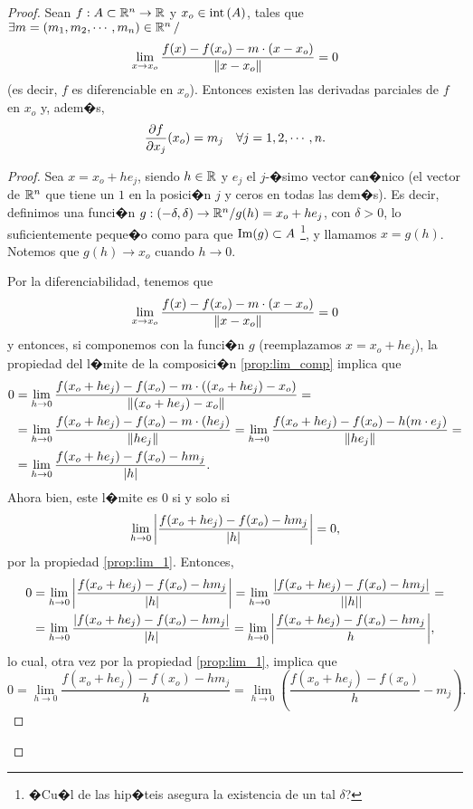 \documentclass[a4paper]{scrartcl} %
\begin{document}
\begin{theorem}
\begin{proof}
\iffalse
Entonces, por la propiedad \eqref{prop:lim_2}, tenemos que
\[
 \lim_{h \to 0} \frac{ f(x_o + h,y_o) - f(x_o,y_o) }{h} = \alpha,
\]
\fi
Sean $f: A \subset \mathbb{R}^n \to \mathbb{R}$ y $x_o \in \operatorname{int}{(A)}$, tales que $\exists m = (m_1, m_2, \cdots, m_n) \in \mathbb{R}^n \, /$
\[
 \lim_{x \to x_o} \frac{f(x) - f(x_o) - m \cdot (x - x_o)}
                                 {\norm{x - x_o}} = 0
\]
(es decir, $f$ es diferenciable en $x_o$). Entonces existen las derivadas parciales de $f$ en $x_o$ y, adem�s,
\[
 \dfrac{\partial f}{\partial x_j} (x_o) = m_j \quad \forall j = 1, 2, \cdots, n.
\]

 \begin{proof}
 \mbox{}
 
Sea $x = x_o + h e_j$, siendo $h \in \mathbb{R}$ y $e_j$ el $j$-�simo vector can�nico (el vector de $\mathbb{R}^n$ que tiene un $1$ en la posici�n $j$ y ceros en todas las dem�s). Es decir, definimos una funci�n $g:(-\delta,\delta) \to \mathbb{R}^n / g(h) = x_o + h e_j$, con $\delta > 0$, lo suficientemente peque�o como para que $\operatorname{Im}(g) \subset A$ \footnote{�Cu�l de las hip�teis asegura la existencia de un tal $\delta$?}, y llamamos $x = g(h)$. Notemos que $g(h) \to x_o$ cuando $h \to 0$. 

Por la diferenciabilidad, tenemos que 
\[
 \lim_{x \to x_o} \frac{f(x) - f(x_o) - m \cdot (x - x_o)}
                                 {\norm{x - x_o}} = 0
\]
y entonces, si componemos con la funci�n $g$ (reemplazamos $x = x_o + h e_j$), la propiedad del l�mite de la composici�n \eqref{prop:lim_comp} implica que
\begin{align*}
  0 & = \lim_{h \to 0} \frac{f(x_o + h e_j) - f(x_o) - m \cdot ((x_o + he_j) - x_o)}
                                 {\norm{(x_o + he_j) - x_o}} = \\
    & = \lim_{h \to 0} \frac{f(x_o + h e_j) - f(x_o) - m \cdot (he_j)}{\norm{h e_j}} = \lim_{h \to 0} \frac{f(x_o + h e_j) - f(x_o) - h(m \cdot e_j)}{\norm{h e_j}} =\\
    & = \lim_{h \to 0} \frac{f(x_o + h e_j) - f(x_o) - h m_j}{\abs{h}} .
\end{align*}                                
Ahora bien, este l�mite es $0$ si y solo si
\[
 \lim_{h \to 0} \abs{ \frac{f(x_o + h e_j) - f(x_o) - h m_j}{\abs{h}} } = 0,
\]
por la propiedad \eqref{prop:lim_1}. Entonces,
\begin{align*}
  0 & = \lim_{h \to 0} \abs{ \frac{f(x_o + h e_j) - f(x_o) - h m_j}{\abs{h}} }
      = \lim_{h \to 0} \frac{\abs{f(x_o + h e_j) - f(x_o) - h m_j}}{\abs{\abs{h}}} = \\
    & = \lim_{h \to 0} \frac{\abs{f(x_o + h e_j) - f(x_o) - h m_j}}{\abs{h}}
      = \lim_{h \to 0} \abs{ \frac{f(x_o + h e_j) - f(x_o) - h m_j}{h} },
\end{align*} 
lo cual, otra vez por la propiedad \eqref{prop:lim_1}, implica que 
\[
 0 = \lim_{h \to 0} \frac{f(x_o + h e_j) - f(x_o) - h m_j}{h} =
     \lim_{h \to 0} \left( \frac{f(x_o + h e_j) - f(x_o)}{h} - m_j \right) .
\]


\end{proof}
\end{proof}
\end{theorem}
\end{document}
